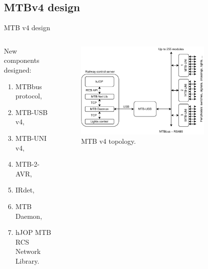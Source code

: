 \documentclass[aspectratio=169]{beamer}
\begin{document}

\subsection{MTBv4 design}

\begin{frame}{MTB v4 design}
\begin{columns}
	\begin{column}{.3\textwidth}
		New components designed:
		\begin{enumerate}
		\item MTBbus protocol,
		\item MTB-USB v4,
		\item MTB-UNI v4,
		\item MTB-2-AVR,
		\item IRdet,
		\item MTB Daemon,
		\item hJOP MTB RCS Network Library.
		\end{enumerate}
	\end{column}
	\begin{column}{.4\textwidth}
		\begin{figure}
		\includegraphics[width=\columnwidth]{data/new-topology-en.pdf}
		\caption{MTB v4 topology.}
		\end{figure}
	\end{column}
	\begin{column}{.3\textwidth}
		\begin{figure}

\end{figure}
\end{column}
\end{columns}
\end{frame}
\end{document}
